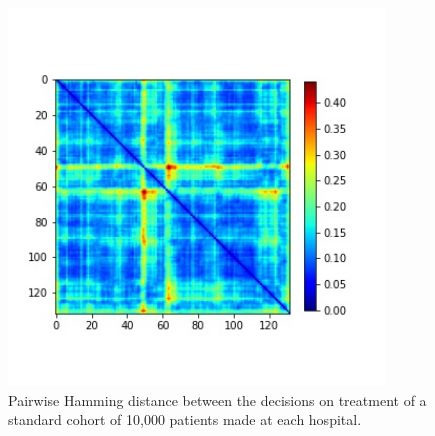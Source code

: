 \documentclass[12pt,a4paper, pdftex]{elsarticle}
\begin{document}
\begin{figure}[h]
\centering
\includegraphics[width=10cm]{figures/cohort_distance_all.jpg}
\caption{Pairwise Hamming distance between the decisions on treatment of a standard cohort of 10,000 patients made at each hospital.}
\label{fig:cohort_distance_all}
\end{figure}

\end{document}
